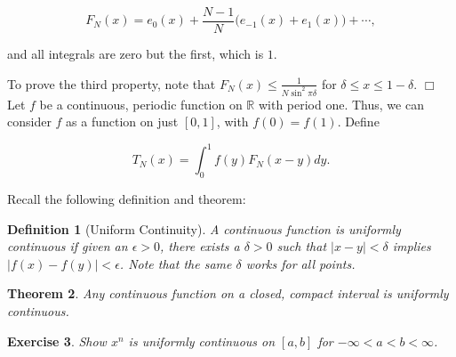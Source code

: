 \documentclass[12pt,letterpaper]{report}
\newcommand\be{\begin{equation}}
\newcommand\ee{\end{equation}}
\newcommand{\R}{\ensuremath{\mathbb{R}}}
\newtheorem{thm}{Theorem}[section]
\newtheorem{defi}[thm]{Definition}
\newtheorem{exe}[thm]{Exercise}
\begin{document}
\be F_N(x) = e_0(x) + \frac{N-1}{N}\Big(e_{-1}(x) + e_1(x)\Big) +
\cdots, \ee

and all integrals are zero but the first, which is $1$.

To prove the third property, note that $F_N(x) \le \frac{1}{N
\sin^2 \pi \delta}$ for $\delta \le x \le 1 - \delta$. $\Box$ \\


Let $f$ be a continuous, periodic function on $\R$ with period
one. Thus, we can consider $f$ as a function on just $[0,1]$, with
$f(0) = f(1)$. Define

\be T_N(x) = \int_0^1 f(y) F_N(x-y) d y .\ee

Recall the following definition and theorem:

\begin{defi}[Uniform Continuity] A continuous function is
uniformly continuous if given an $\epsilon > 0$, there exists a
$\delta > 0$ such that $|x-y| < \delta$ implies $|f(x) - f(y)| <
\epsilon$. Note that the same $\delta$ works for all points.
\end{defi}

\begin{thm} Any continuous function on a closed, compact interval
is uniformly continuous. \end{thm}

\begin{exe} Show $x^n$ is uniformly continuous on $[a,b]$ for
$-\infty < a < b < \infty$. \end{exe}
\end{document}
